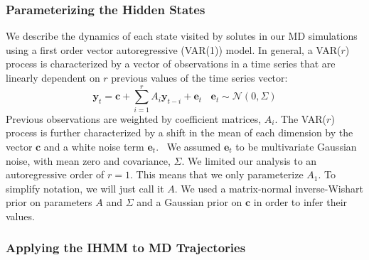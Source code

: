\documentclass[journal=jpcbfk,manuscript=article]{achemso}
\begin{document}
  \subsubsection*{Parameterizing the Hidden States}\label{method:var_params}
  
  We describe the dynamics of each state visited by solutes in our MD simulations using
  a first order vector autoregressive (VAR(1)) model. In general, a VAR($r$) process is characterized by a
  vector of observations in a time series that are linearly dependent on $r$ previous
  values of the time series vector:
  \begin{equation}
  	\mathbf{y}_t = \mathbf{c} + \sum_{i=1}^r A_i\mathbf{y}_{t-i} + \mathbf{e}_t~~~~\mathbf{e}_t \sim \mathcal{N}(0, \Sigma)
  \label{eqn:var}
  \end{equation}
  Previous observations are weighted by coefficient matrices, $A_i$. The VAR($r$) 
  process is further characterized by a shift in the mean of each dimension by the
  vector $\mathbf{c}$ and a white noise term $\mathbf{e}_t$.~\cite{hamilton_time_1994}
  We assumed $\mathbf{e}_t$ to be multivariate Gaussian noise, with mean zero and
  covariance, $\Sigma$. We limited our analysis to an autoregressive order of $r=1$.
  This means that we only parameterize $A_1$. To simplify notation, we will just
  call it $A$. We used a matrix-normal inverse-Wishart prior on parameters $A$ and 
  $\Sigma$ and a Gaussian prior on $\mathbf{c}$ in order to infer their 
  values.~\cite{fox_nonparametric_2009}
   
  \subsubsection*{Applying the IHMM to MD Trajectories} 
   
\end{document}
